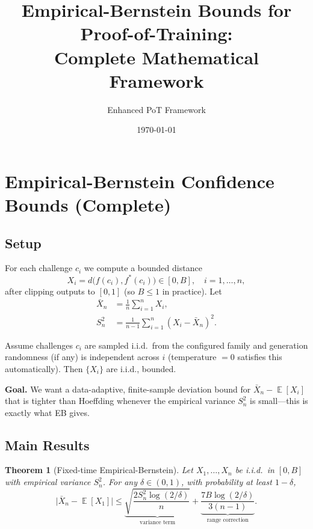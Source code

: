 \documentclass[11pt]{article}
\title{Empirical-Bernstein Bounds for Proof-of-Training:\\Complete Mathematical Framework}
\author{Enhanced PoT Framework}
\date{\today}
\newtheorem{theorem}{Theorem}
\DeclareMathOperator{\E}{\mathbb{E}}
\begin{document}
\maketitle

\section{Empirical-Bernstein Confidence Bounds (Complete)}

\subsection{Setup}

For each challenge $c_i$ we compute a bounded distance
\begin{equation}
X_i = d\big(f(c_i), f^*(c_i)\big) \in [0,B], \quad i=1,\dots,n,
\end{equation}
after clipping outputs to $[0,1]$ (so $B \le 1$ in practice). Let
\begin{align}
\bar{X}_n &= \frac{1}{n}\sum_{i=1}^n X_i,\\
S_n^2 &= \frac{1}{n-1}\sum_{i=1}^n (X_i-\bar{X}_n)^2.
\end{align}

Assume challenges $c_i$ are sampled i.i.d.\ from the configured family and generation randomness (if any) is independent across $i$ (temperature $=0$ satisfies this automatically). Then $\{X_i\}$ are i.i.d., bounded.

\textbf{Goal.} We want a data-adaptive, finite-sample deviation bound for $\bar{X}_n - \E[X_i]$ that is tighter than Hoeffding whenever the empirical variance $S_n^2$ is small—this is exactly what EB gives.

\subsection{Main Results}

\begin{theorem}[Fixed-time Empirical-Bernstein]
\label{thm:eb-fixed}
Let $X_1,\dots,X_n$ be i.i.d.\ in $[0,B]$ with empirical variance $S_n^2$. For any $\delta\in(0,1)$, with probability at least $1-\delta$,
\begin{equation}
\bigl|\bar{X}_n - \E[X_1]\bigr| \le 
\underbrace{\sqrt{\frac{2 S_n^2 \log(2/\delta)}{n}}}_{\text{variance term}} + 
\underbrace{\frac{7B\log(2/\delta)}{3(n-1)}}_{\text{range correction}}.
\tag{EB}
\end{equation}
\end{theorem}
\end{document}
